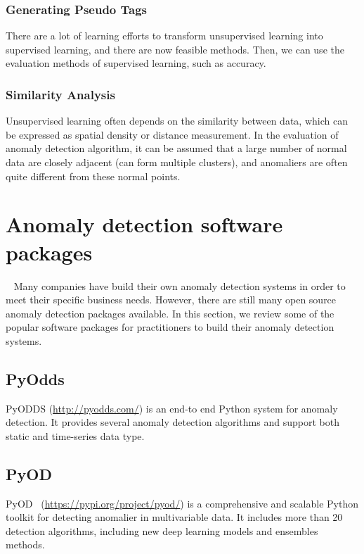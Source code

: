 \subsubsection{Generating Pseudo Tags}

There are a lot of learning efforts to transform
unsupervised learning into supervised learning,
and there are now feasible methods.
Then,
we can use the evaluation methods of supervised learning,
such as accuracy.

\subsubsection{Similarity Analysis}

Unsupervised learning often depends
on the similarity between data,
which can be expressed as spatial density
or distance measurement.
In the evaluation of anomaly detection algorithm,
it can be assumed that a large number of normal
data are closely adjacent (can form multiple clusters),
and anomaliers are often quite different from these normal points.

\section{Anomaly detection software packages}~\label{sec:tools}
Many companies have build
their own anomaly detection systems in order to
meet their specific business needs.
However,
there are still many open source anomaly detection packages available.
In this section,
we review some of the popular software packages for
practitioners to build their anomaly detection systems.

\subsection{PyOdds}

PyODDS (\href{http://pyodds.com/}{http://pyodds.com/})
is an end-to end Python system for
anomaly detection.
It provides several anomaly detection algorithms and
support both static and time-series data type.

\subsection{PyOD}
PyOD~\cite{zhao2019pyod} (\href{https://pypi.org/project/pyod/}{https://pypi.org/project/pyod/})
is a comprehensive and scalable Python toolkit for
detecting anomalier in multivariable data.
It includes more than 20 detection algorithms,
including new deep learning models and ensembles methods.

